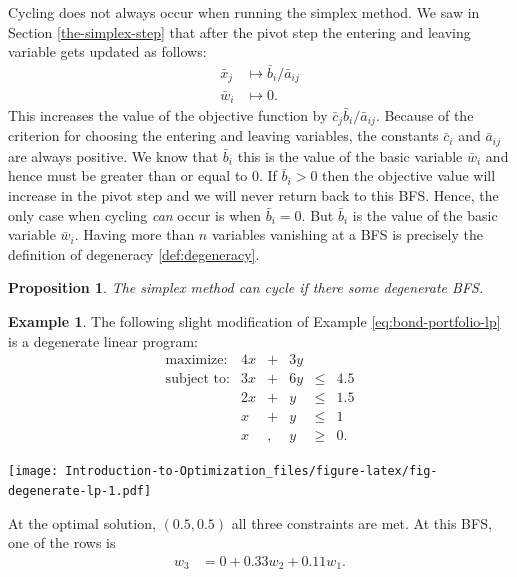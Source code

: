 \documentclass[
]{book}
\newtheorem{proposition}{Proposition}[chapter]
\theoremstyle{definition}
\theoremstyle{definition}
\newtheorem{example}{Example}[chapter]
\theoremstyle{definition}
\theoremstyle{definition}
\theoremstyle{remark}
\begin{document}
Cycling does not always occur when running the simplex method. We saw in Section \ref{the-simplex-step} that after the pivot step the entering and leaving variable gets updated as follows:
\begin{align*}
  \bar{x}_j & \mapsto \bar{b}_i/\bar{a}_{ij} \\
  \bar{w}_i & \mapsto 0.
\end{align*}
This increases the value of the objective function by \(\bar{c}_j \bar{b}_i/\bar{a}_{ij}\).
Because of the criterion for choosing the entering and leaving variables, the constants \(\bar{c}_i\) and \(\bar{a}_{ij}\) are always positive. We know that \(\bar{b}_i\) this is the value of the basic variable \(\bar{w}_i\) and hence must be greater than or equal to 0.
If \(\bar{b}_i > 0\) then the objective value will increase in the pivot step and we will never return back to this BFS.
Hence, the only case when cycling \emph{can} occur is when \(\bar{b}_i = 0\).
But \(\bar{b}_i\) is the value of the basic variable \(\bar{w}_i\).
Having more than \(n\) variables vanishing at a BFS is precisely the definition of degeneracy \ref{def:degeneracy}.

\begin{proposition}
The simplex method can cycle if there some degenerate BFS.
\end{proposition}

\begin{example}
The following slight modification of Example \eqref{eq:bond-portfolio-lp} is a degenerate linear program:
\begin{equation*}
  \begin{array}{rrrrrl}
  \mbox{maximize:} & 4x & + & 3y \\
  \mbox{subject to:}
    & 3x & + & 6y & \le & 4.5 \\
    & 2x & + & y & \le & 1.5 \\
    & x & + & y & \le & 1 \\
    & x & , & y & \ge & 0.
  \end{array}
\end{equation*}

\texttt{[image: Introduction-to-Optimization\_files/figure-latex/fig-degenerate-lp-1.pdf]}

At the optimal solution, \((0.5, 0.5)\) all three constraints are met. At this BFS, one of the rows is
\begin{align}
  w_3 &= 0 + 0.33 w_2 + 0.11 w_1.
\end{align}
\end{example}
\end{document}
